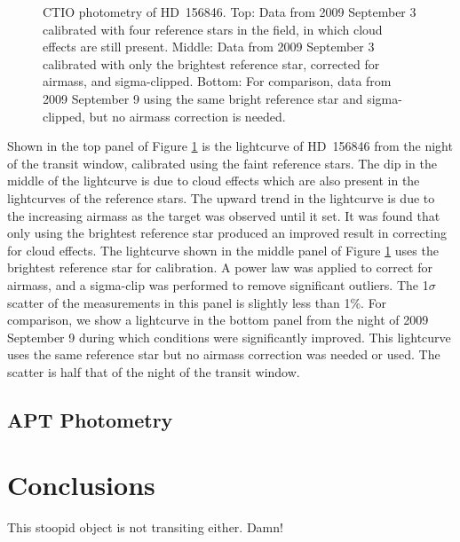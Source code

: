 \documentclass[12pt,preprint]{emulateapj}
\begin{document}
\begin{figure}
  \caption{CTIO photometry of HD~156846. Top: Data from 2009 September
    3 calibrated with four reference stars in the field, in which
    cloud effects are still present. Middle: Data from 2009 September
    3 calibrated with only the brightest reference star, corrected
    for airmass, and sigma-clipped. Bottom: For comparison, data from
    2009 September 9 using the same bright reference star and
    sigma-clipped, but no airmass correction is needed.}
  \label{fig:phot1}
\end{figure}

Shown in the top panel of Figure \ref{fig:phot1} is the lightcurve of
HD~156846 from the night of the transit window, calibrated using the
faint reference stars. The dip in the middle of the lightcurve is due
to cloud effects which are also present in the lightcurves of the
reference stars. The upward trend in the lightcurve is due to the
increasing airmass as the target was observed until it set. It was
found that only using the brightest reference star produced an
improved result in correcting for cloud effects. The lightcurve shown
in the middle panel of Figure \ref{fig:phot1} uses the brightest
reference star for calibration. A power law was applied to correct for
airmass, and a sigma-clip was performed to remove significant
outliers. The 1$\sigma$ scatter of the measurements in this panel is
slightly less than 1\%. For comparison, we show a lightcurve in the
bottom panel from the night of 2009 September 9 during which
conditions were significantly improved. This lightcurve uses the same
reference star but no airmass correction was needed or used. The
scatter is half that of the night of the transit window.

\subsection{APT Photometry}

\section{Conclusions}

This stoopid object is not transiting either. Damn!

\end{document}
